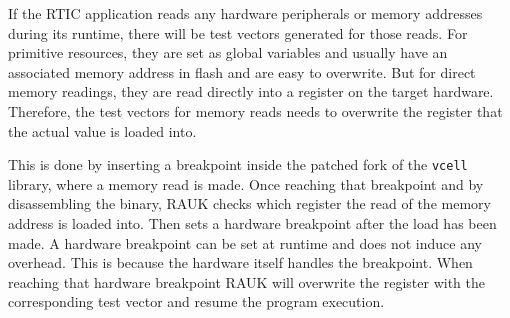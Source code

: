 %
%
%
%
%

If the RTIC application reads any hardware peripherals or memory addresses
during its runtime, there will be test vectors generated for those reads. For
primitive resources, they are set as global variables and usually have an
associated memory address in flash and are easy to overwrite. But for direct
memory readings, they are read directly into a register on the target hardware.
Therefore, the test vectors for memory reads needs to overwrite the register
that the actual value is loaded into.

This is done by inserting a breakpoint inside
the patched fork of the \texttt{vcell} library, where a memory read is made.
Once reaching that breakpoint and by disassembling the binary, RAUK checks
which register the read of the memory address is loaded into. Then sets a
hardware breakpoint after the load has been made. A hardware breakpoint
can be set at runtime and does not induce any overhead. This is because the
hardware itself handles the breakpoint. When reaching that hardware breakpoint
RAUK will overwrite the register with the corresponding test vector and resume
the program execution.

